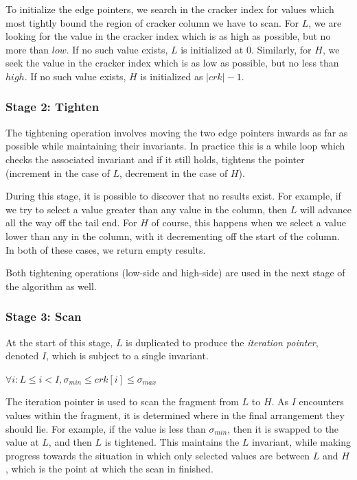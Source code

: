 To initialize the edge pointers, we search in the cracker index for values which most tightly bound the region of cracker column we have to scan. For $L$, we are looking for the value in the cracker index which is as high as possible, but no more than $low$. If no such value exists, $L$ is initialized at 0. Similarly, for $H$, we seek the value in the cracker index which is as low as possible, but no less than $high$. If no such value exists, $H$ is initialized as $|crk| - 1$.

\subsubsection{Stage 2: Tighten}

The tightening operation involves moving the two edge pointers inwards as far as possible while maintaining their invariants. In practice this is a while loop which checks the associated invariant and if it still holds, tightens the pointer (increment in the case of $L$, decrement in the case of $H$).

During this stage, it is possible to discover that no results exist. For example, if we try to select a value greater than any value in the column, then $L$ will advance all the way off the tail end. For $H$ of course, this happens when we select a value lower than any in the column, with it decrementing off the start of the column. In both of these cases, we return empty results.

Both tightening operations (low-side and high-side) are used in the next stage of the algorithm as well.

\subsubsection{Stage 3: Scan}

At the start of this stage, $L$ is duplicated to produce the \textit{iteration pointer}, denoted $I$, which is subject to a single invariant.

\begin{tcolorbox}
$\forall i: L \leq i < I, \sigma _{min} \leq crk[i] \leq \sigma _{max}$
\end{tcolorbox}

The iteration pointer is used to scan the fragment from $L$ to $H$. As $I$ encounters values within the fragment, it is determined where in the final arrangement they should lie. For example, if the value is less than $\sigma _{min}$, then it is swapped to the value at $L$, and then $L$ is tightened. This maintains the $L$ invariant, while making progress towards the situation in which only selected values are between $L$ and $H$, which is the point at which the scan in finished.

